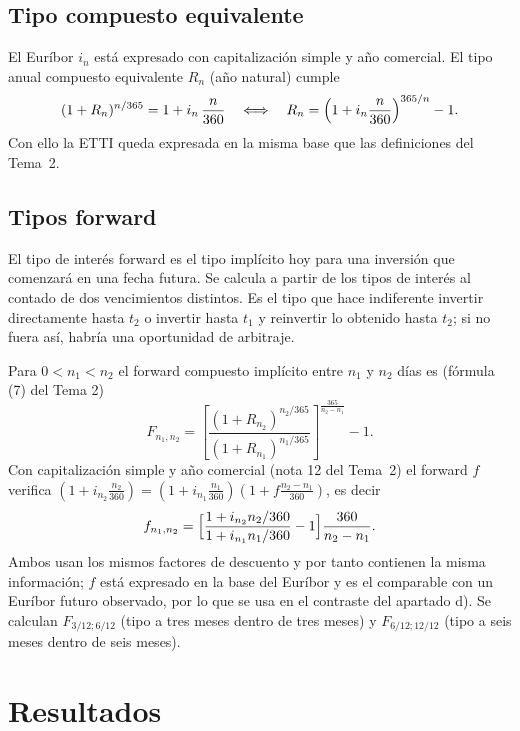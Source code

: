 \documentclass[a4paper,12pt]{article}
\newcommand{\Fw}[2]{F_{#1;#2}}
\begin{document}
\subsection{Tipo compuesto equivalente}
El Euríbor $i_n$ está expresado con capitalización simple y año comercial. El tipo anual compuesto equivalente $R_n$ (año natural) cumple
\begin{equation}(1+R_n)^{n/365}=1+i_n\,\frac{n}{360}\quad\Longleftrightarrow\quad R_n=\Bigl(1+i_n\frac{n}{360}\Bigr)^{365/n}-1.\end{equation}
Con ello la ETTI queda expresada en la misma base que las definiciones del Tema~2.

\subsection{Tipos forward}
El tipo de interés forward es el tipo implícito hoy para una inversión que comenzará en una fecha futura. Se calcula a partir de los tipos de interés al contado de dos vencimientos distintos. Es el tipo que hace indiferente invertir directamente hasta $t_2$ o invertir hasta $t_1$ y reinvertir lo obtenido hasta $t_2$; si no fuera así, habría una oportunidad de arbitraje.

Para $0<n_1<n_2$ el forward compuesto implícito entre $n_1$ y $n_2$ días es (fórmula (7) del Tema 2)
\begin{equation}F_{n_1,n_2}=\left[\frac{(1+R_{n_2})^{n_2/365}}{(1+R_{n_1})^{n_1/365}}\right]^{\frac{365}{n_2-n_1}}-1 .\end{equation}
Con capitalización simple y año comercial (nota 12 del Tema~2) el forward $f$ verifica $(1+i_{n_2}\tfrac{n_2}{360})=(1+i_{n_1}\tfrac{n_1}{360})(1+f\tfrac{n_2-n_1}{360})$, es decir
\begin{equation}f_{n_1,n_2}=\Bigl[\frac{1+i_{n_2}n_2/360}{1+i_{n_1}n_1/360}-1\Bigr]\frac{360}{n_2-n_1}.\end{equation}
Ambos usan los mismos factores de descuento y por tanto contienen la misma información; $f$ está expresado en la base del Euríbor y es el comparable con un Euríbor futuro observado, por lo que se usa en el contraste del apartado d). Se calculan $\Fw{3/12}{6/12}$ (tipo a tres meses dentro de tres meses) y $\Fw{6/12}{12/12}$ (tipo a seis meses dentro de seis meses).

\section{Resultados}
\end{document}
